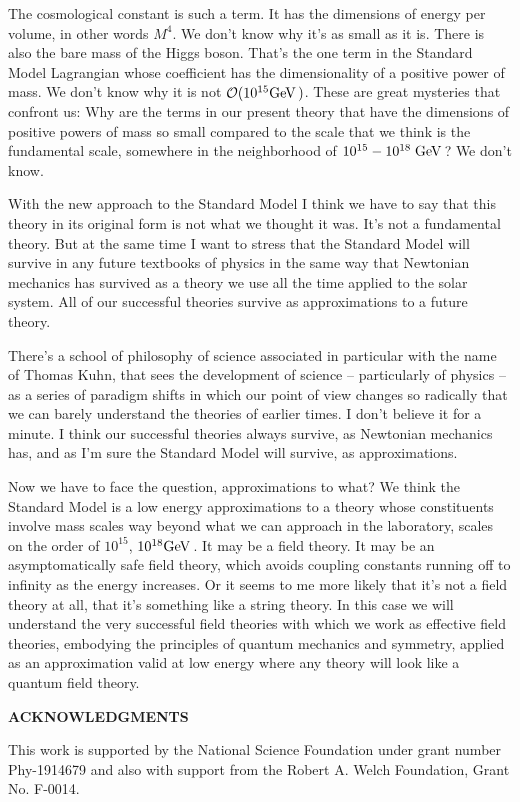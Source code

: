 \documentclass[12pt]{article}
\def\gev{{\rm GeV}\,}
\begin{document}
The cosmological constant is such a term. It has the dimensions of energy per volume, in other words $M^4$. We don't know why it's as small as it is.  There is also the bare mass of the Higgs boson. That's the one  term in the Standard Model Lagrangian whose  coefficient has the dimensionality of a positive power of mass. We don't know why it is not ${\cal O}(10^{15}\gev)$. These are  great mysteries that confront us: Why are the terms in our present theory that have the dimensions of positive powers of mass so small compared to the scale that we think is the fundamental scale, somewhere in the neighborhood of $10^{15}-10^{18}\;\gev$? We don't know. 

With the new approach to the Standard Model I think we have to say that this theory in its original form is not what we thought it was. It's not a fundamental theory. But at the same time I want to stress that the Standard Model will survive in any future textbooks of physics in the same way that Newtonian mechanics has survived as  a theory we use all the time applied to the solar system. All of our successful theories survive as approximations to a future theory. 

There's a school of philosophy of science associated in particular with the name of Thomas Kuhn, that sees the development of science -- particularly of physics -- as a series of paradigm shifts in which our point of view changes so radically that we can barely understand the theories of earlier times. I don't believe it for a minute.  I think our successful theories always survive, as Newtonian mechanics has, and as I'm sure the Standard Model will survive, as approximations. 

Now we have to face the question, approximations to what?  We think the Standard Model is a low energy approximations to a theory whose constituents involve mass scales way beyond what we can approach in the laboratory, scales on the order of $10^{15}$, $10^{18}\gev$. It may be a field theory. It may be an asymptomatically safe field theory, which avoids coupling constants running off to infinity as the energy increases. Or it seems to me more likely that it's not a field theory at all, that it's something like a string theory.  In this case we will understand the very successful field theories with which we work as effective field theories, embodying the principles of quantum mechanics and symmetry, applied as an approximation valid at low energy  where any theory will look like a quantum field theory. 

\vspace{10pt}

\vspace{10pt}

\begin{center}
{\bf 	ACKNOWLEDGMENTS}
\end{center}

This work  is supported by the National Science Foundation under grant number
Phy-1914679 and also with support from the Robert A. Welch Foundation, Grant No. F-0014. 
\end{document}
